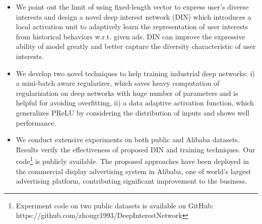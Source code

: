 \begin{itemize}
\item We point out the limit of using fixed-length vector to express user's diverse interests and design a novel deep interest network (DIN) which introduces a local activation unit to adaptively learn the representation of user interests from historical behaviors w.r.t. given ads. DIN can improve the expressive ability of model greatly and better capture the diversity characteristic of user interests. 
\item We develop two novel techniques to help training industrial deep networks: i) a mini-batch aware regularizer, which saves heavy computation of regularization on deep networks with huge number of parameters and is helpful for avoiding overfitting, ii) a data adaptive activation function, which generalizes PReLU by considering the distribution of inputs and shows well performance.
\item We conduct extensive experiments on both public and Alibaba datasets. Results verify the effectiveness of proposed DIN and training techniques. Our code\footnote{Experiment code on two public datasets is available on GitHub: https://github.com/zhougr1993/DeepInterestNetwork\label{code}} is publicly available. The proposed approaches have been deployed in the commercial display advertising system in Alibaba, one of world's largest advertising platform, contributing significant improvement to the business. 
\end{itemize}





